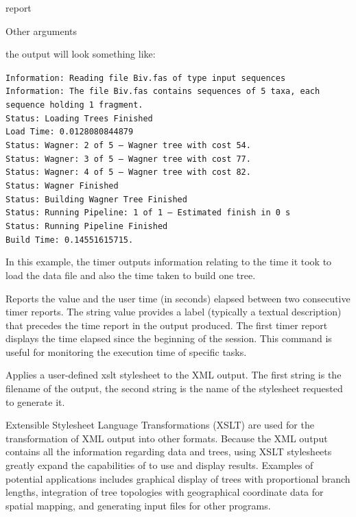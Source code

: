 \begin{command}{report}{}
\begin{arguments}
\begin{argumentgroup}{Other arguments}
\begin{statement}
	     the output will look something like:
	\begin{flushleft}     
	    	 \texttt{Information: Reading file Biv.fas of type input sequences\\
		Information: The file Biv.fas contains sequences of 5 taxa, each
             	 sequence holding 1 fragment.\\
		Status: Loading Trees Finished\\
		Load Time: 0.0128080844879\\
		Status: Wagner: 2 of 5 -- Wagner tree with cost 54.\\
		Status: Wagner: 3 of 5 -- Wagner tree with cost 77.\\
		Status: Wagner: 4 of 5 -- Wagner tree with cost 82.\\
		Status: Wagner Finished\\
		Status: Building Wagner Tree Finished\\
		Status: Running Pipeline: 1 of 1 -- Estimated finish in 0 s\\
		Status: Running Pipeline Finished\\
		Build Time: 0.14551615715.}
	\end{flushleft}
	In this example, the timer outputs information relating to the time it took 
	\poy to load the data file and also the time taken to build one tree.
	     \end{statement}
	     
                {Reports the value and the user time (in seconds) elapsed between
                two consecutive timer reports. The string value provides a label
                (typically a textual description) that precedes the time report
                in the output produced.
                The first timer report displays the time elapsed since the beginning of the
                \poy session. This command is useful for monitoring the execution time
                of specific tasks.}
                {}
                
	     {Applies a user-defined xslt stylesheet to the XML output. The first string is
	     the filename of the output, the second string is the name of the stylesheet
	     requested to generate it.}
	     {}
	     
	     \begin{statement}
	     Extensible Stylesheet Language Transformations (XSLT) are used
	     for the transformation of XML output into other formats. Because the XML 
	     output contains all the information regarding data and trees, using XSLT 
	     stylesheets greatly expand the capabilities of \poy to use and display results.
	     Examples of potential applications includes graphical display of trees with 
	     proportional branch lengths, integration of tree topologies with geographical 
	     coordinate data for spatial mapping, and generating input files for other programs.
	     \end{statement}
	     

\end{argumentgroup}
\end{arguments}
\end{command}

